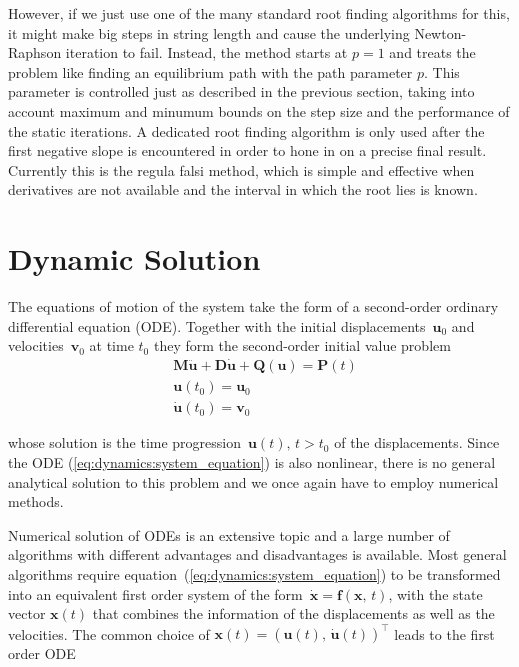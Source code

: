 However, if we just use one of the many standard root finding algorithms for this, it might make big steps in string length and cause the underlying Newton-Raphson iteration to fail.
Instead, the method starts at $p = 1$ and treats the problem like finding an equilibrium path with the path parameter $p$.
This parameter is controlled just as described in the previous section, taking into account maximum and minumum bounds on the step size and the performance of the static iterations.
A dedicated root finding algorithm is only used after the first negative slope is encountered in order to hone in on a precise final result.
Currently this is the regula falsi method, which is simple and effective when derivatives are not available and the interval in which the root lies is known.

\newpage
\section{Dynamic Solution}

The equations of motion of the system take the form of a second-order ordinary differential equation (ODE).
Together with the initial displacements~$\boldsymbol{u}_0$ and velocities~$\mathbf{v}_0$ at time $t_0$ they form the second-order initial value problem
%
\begin{align}
&\boldsymbol{M}\ddot{\boldsymbol{u}} + \boldsymbol{D}\dot{\boldsymbol{u}} + \boldsymbol{Q}(\boldsymbol{u}) = \boldsymbol{P}(t) \label{eq:dynamics:system_equation} \\
&\boldsymbol{u}(t_0) = \boldsymbol{u}_0 \\
&\dot{\boldsymbol{u}}(t_0) = \mathbf{v}_0
\end{align}

whose solution is the time progression~$\boldsymbol{u}(t),\,t > t_0$ of the displacements.
Since the ODE (\ref{eq:dynamics:system_equation}) is also nonlinear, there is no general analytical solution to this problem and we once again have to employ numerical methods.

Numerical solution of ODEs is an extensive topic and a large number of algorithms with different advantages and disadvantages is available.
Most general algorithms require equation~(\ref{eq:dynamics:system_equation}) to be transformed into an equivalent first order system of the form~$\dot{\boldsymbol{x}} = \boldsymbol{f}(\boldsymbol{x},\,t)$, with the state vector $\boldsymbol{x}(t)$ that combines the information of the displacements as well as the velocities.
The common choice of $\boldsymbol{x}(t) = (\boldsymbol{u}(t),\,\dot{\boldsymbol{u}}(t))^\intercal$ leads to the first order ODE

